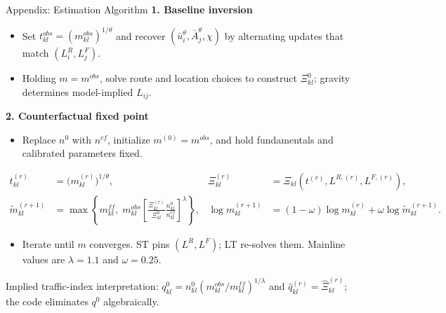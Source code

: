 \documentclass[11pt,aspectratio=169]{beamer}
\newcommand{\navback}[1]{\par\vspace{0.35em}\noindent\hfill\hyperlink{#1}{\beamerreturnbutton{back}}}
\begin{document}
\begin{frame}[label=appfund]{Appendix: Estimation Algorithm}
\small\textbf{1. Baseline inversion}\par
\vspace{0.08em}
\begin{itemize}\footnotesize\setlength\itemsep{0.22em}
  \item Set $t_{kl}^{obs}=(m_{kl}^{obs})^{1/\theta}$ and recover $(\bar u_i^\theta,\bar A_j^\theta,\chi)$ by alternating updates that match $(L_i^R,L_j^F)$.
  \item Holding $m=m^{obs}$, solve route and location choices to construct $\Xi_{kl}^{0}$; gravity determines model-implied $L_{ij}$.
\end{itemize}
\vspace{0.10em}
\small\textbf{2. Counterfactual fixed point}\par
\vspace{0.04em}
\begin{itemize}\footnotesize\setlength\itemsep{0.18em}
  \item Replace $n^0$ with $n^{cf}$, initialize $m^{(0)}=m^{obs}$, and hold fundamentals and calibrated parameters fixed.
\end{itemize}
\vspace{-0.62em}
{\footnotesize\begin{align*}
  t_{kl}^{(r)}&=\big(m_{kl}^{(r)}\big)^{1/\theta},
  &\Xi_{kl}^{(r)}&=\Xi_{kl}\!\left(t^{(r)},L^{R,(r)},L^{F,(r)}\right),\\[-0.15em]
  \widetilde m_{kl}^{(r+1)}
  &=\max\!\left\{m_{kl}^{ff},\;
  m_{kl}^{obs}\left[
  \frac{\Xi_{kl}^{(r)}}{\Xi_{kl}^{0}}
  \frac{n_{kl}^{0}}{n_{kl}^{cf}}
  \right]^{\lambda}\right\},
  &\log m_{kl}^{(r+1)}
  &=(1-\omega)\log m_{kl}^{(r)}+\omega\log\widetilde m_{kl}^{(r+1)}.
\end{align*}}
\vspace{-0.65em}
\begin{itemize}\footnotesize\setlength\itemsep{0.18em}
  \item Iterate until $m$ converges. ST pins $(L^R,L^F)$; LT re-solves them. Mainline values are $\lambda=1.1$ and $\omega=0.25$.
\end{itemize}
\vspace{-0.03em}
{\scriptsize\color{gray!80} Implied traffic-index interpretation: $q_{kl}^{0}=n_{kl}^{0}(m_{kl}^{obs}/m_{kl}^{ff})^{1/\lambda}$ and $\widehat q_{kl}^{(r)}=\widehat\Xi_{kl}^{(r)}$; the code eliminates $q^0$ algebraically.}
\navback{fundamentals}
\end{frame}
\end{document}
